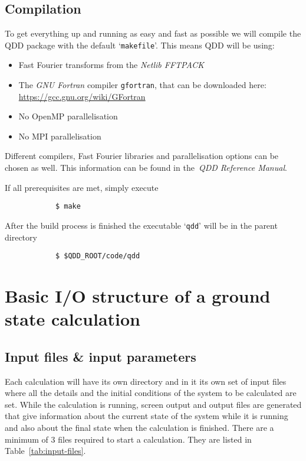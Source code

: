 \documentclass[11pt,a4paper]{article}
\begin{document}
		\subsection{Compilation}
			To get everything up and running as easy and fast as possible we will compile the QDD package with the default `\texttt{makefile}'. This means QDD will be using:
		\begin{itemize}
			\item Fast Fourier transforms from the \textit{Netlib FFTPACK}
			\item The \textit{GNU Fortran} compiler \texttt{gfortran}, that can be downloaded here:\\ \url{https://gcc.gnu.org/wiki/GFortran}
			\item No OpenMP parallelisation
			\item No MPI parallelisation
		\end{itemize}
		Different compilers, Fast Fourier libraries and parallelisation options can be chosen as well. This information can be found in the~\textit{QDD Reference Manual}.
		
		If all prerequisites are met, simply execute
		\begin{verbatim}
			$ make
		\end{verbatim}
		After the build process is finished the executable `\texttt{qdd}' will be in the parent directory
		\begin{verbatim}
			$ $QDD_ROOT/code/qdd
		\end{verbatim}

	\section{Basic I/O structure of a ground state calculation}
		
		\subsection{Input files \& input parameters}
		Each calculation will have its own directory and in it its own set of input files where all the details and the initial conditions of the system to be calculated are set. While the calculation is running, screen output and output files are generated that give information about the current state of the system while it is running and also about the final state when the calculation is finished. There are a minimum of 3 files required to start a calculation. They are listed in Table~\ref{tab:input-files}.
		
\end{document}
